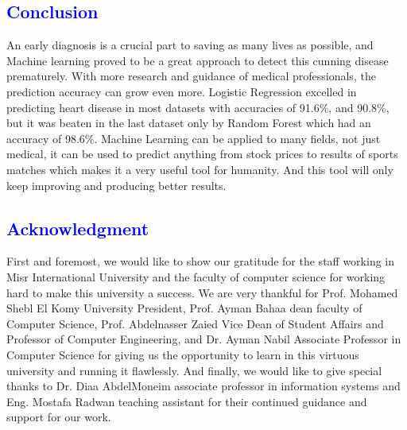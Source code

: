 \documentclass[conference]{IEEEtran}
\newcommand{\mar}[1]{\textcolor{blue}{#1}}
\begin{document}
 \mar{\section{\textbf{\large Conclusion}}} 
\label{Conclusion}
An early diagnosis is a crucial part to saving as many lives as possible, and Machine learning proved to be a great approach to detect this cunning disease prematurely. With more research and guidance of medical professionals, the prediction accuracy can grow even more. Logistic Regression excelled in predicting heart disease in most datasets with accuracies of 91.6\%, and 90.8\%, but it was beaten in the last dataset only by Random Forest which had an accuracy of 98.6\%. Machine Learning can be applied to many fields, not just medical, it can be used to predict anything from stock prices to results of sports matches which makes it a very useful tool for humanity. And this tool will only keep improving and producing better results.

\mar{\section{\textbf{\large Acknowledgment}}} 
\label{Acknowledgement}
First and foremost, we would like to show our gratitude for the staff working in Misr International University and the faculty of computer science for working hard to make this university a success. We are very thankful for Prof. Mohamed Shebl El Komy University President, Prof. Ayman Bahaa dean faculty of Computer Science, Prof. Abdelnasser Zaied Vice Dean of Student Affairs and Professor of Computer Engineering, and Dr. Ayman Nabil Associate Professor in Computer Science for giving us the opportunity to learn in this virtuous university and running it flawlessly. And finally, we would like to give special thanks to Dr. Diaa AbdelMoneim associate professor in information systems and Eng. Mostafa Radwan teaching assistant for their continued guidance and support for our work.



\end{document}
